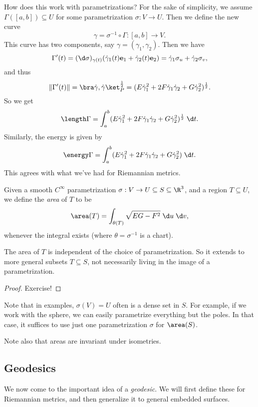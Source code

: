 \documentclass[a4paper]{article}
\begin{document}
How does this work with parametrizations? For the sake of simplicity, we assume $\Gamma([a, b]) \subseteq U$ for some parametrization $\sigma: V \to U$. Then we define the new curve
\[
  \gamma = \sigma^{-1} \circ \Gamma: [a, b] \to V.
\]
This curve has two components, say $\gamma = (\gamma_1, \gamma_2)$. Then we have
\[
  \Gamma'(t) = (\d \sigma)_{\gamma(t)}(\dot{\gamma}_1(t) \mathbf{e}_1 + \dot{\gamma}_2(t) \mathbf{e}_2) = \dot{\gamma}_1 \sigma_u + \dot{\gamma}_2 \sigma_v,
\]
and thus
\[
  \|\Gamma'(t)\| = \bra \dot{\gamma}, \dot{\gamma}\ket_P^{\frac{1}{2}} = (E \dot{\gamma}_1^2 + 2F \dot{\gamma}_1 \dot{\gamma}_2 + G \dot{\gamma}_2^2)^{\frac{1}{2}}.
\]
So we get
\[
  \length \Gamma = \int_a^b (E \dot{\gamma}_1^2 + 2F \dot{\gamma}_1 \dot{\gamma}_2 + G \dot{\gamma}_2^2)^{\frac{1}{2}}\;\d t.
\]
Similarly, the energy is given by
\[
  \energy \Gamma = \int_a^b (E \dot{\gamma}_1^2 + 2F \dot{\gamma}_1 \dot{\gamma}_2 + G \dot{\gamma}_2^2)\;\d t.
\]
This agrees with what we've had for Riemannian metrics.
\begin{defi}[Area]
  Given a smooth $C^\infty$ parametrization $\sigma: V \to U \subseteq S \subseteq \R^3$, and a region $T \subseteq U$, we define the \emph{area} of $T$ to be
  \[
    \area(T) = \int_{\theta(T)} \sqrt{EG - F^2} \;\d u\;\d v,
  \]
  whenever the integral exists (where $\theta = \sigma^{-1}$ is a chart).
\end{defi}

\begin{prop}
  The area of $T$ is independent of the choice of parametrization. So it extends to more general subsets $T \subseteq S$, not necessarily living in the image of a parametrization.
\end{prop}

\begin{proof}
  Exercise! %
\end{proof}

Note that in examples, $\sigma(V) = U$ often is a dense set in $S$. For example, if we work with the sphere, we can easily parametrize everything but the poles. In that case, it suffices to use just one parametrization $\sigma$ for $\area (S)$.

Note also that areas are invariant under isometries.
\subsection{Geodesics}
We now come to the important idea of a \emph{geodesic}. We will first define these for Riemannian metrics, and then generalize it to general embedded surfaces.
\end{document}
